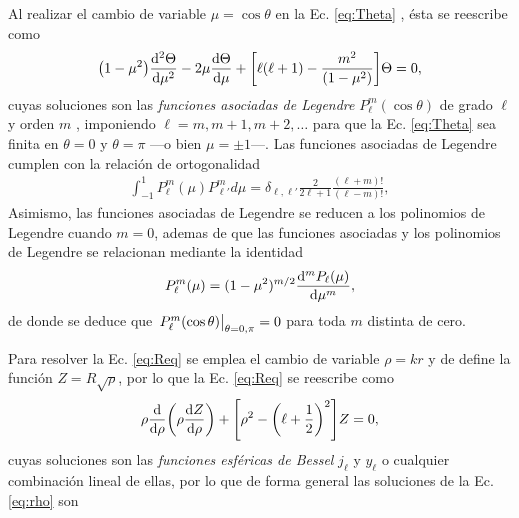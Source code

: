 Al realizar el cambio de variable $\mu = \cos\theta$ en la Ec. \eqref{eq:Theta} , ésta se reescribe como
	\begin{align*}
	\qty(1-\mu^2) \dv[2]{\Theta}{\mu} - 2 \mu \dv{\Theta}{\mu} + \qty[\ell(\ell+1)-\frac{m^2}{(1-\mu^2)}]\Theta= 0,
	\end{align*}
cuyas soluciones son	las \emph{funciones asociadas de Legendre} $P_\ell^m(\cos\theta)$ de grado $\ell$ y orden $m$  \cite{arfken2001methods}, imponiendo $\ell = m, m+1,m+2,\ldots$ para  que la Ec. \eqref{eq:Theta} sea finita en $\theta = 0$ y $\theta = \pi$ ---o bien $\mu=\pm1$---. Las funciones asociadas de Legendre cumplen con la relación de ortogonalidad
	\begin{align}
	\int_{-1}^1P_\ell^m(\mu) P_{\ell'}^md\mu = \delta_{\ell,\ell'}\frac{2}{2\ell+1}\frac{(\ell+m)!}{(\ell-m)!},
	\label{eq:ortLegendre}
	\end{align}
Asimismo, las funciones asociadas de Legendre se reducen a los polinomios de Legendre cuando $m=0$, ademas de que las funciones asociadas y los polinomios de Legendre se relacionan mediante la identidad  \cite{arfken2001methods}
	\begin{align}
	P_\ell^m (\mu) = (1-\mu^2)^{m/2}\dv[m]{P_\ell(\mu)}{\mu},
	\label{eq:Legendre}
	\end{align}
de donde se deduce  que $\eval{P_\ell^m(\cos\theta)}_{\theta=0,\pi}=0$ para toda $m$ distinta de cero. %

Para resolver la Ec. \eqref{eq:Req} se emplea el cambio de variable $\rho = k r$ y de define la función $Z =R\sqrt{\rho}$, por lo que la Ec. \eqref{eq:Req} se reescribe como
	\begin{align}
	\rho \dv{\rho}\qty(\rho\dv{Z}{\rho})+\qty[\rho^2-\qty(\ell+\frac12)^2] Z = 0,
	\label{eq:rho}
	\end{align}
cuyas soluciones son las \emph{funciones esféricas de Bessel} $j_\ell$ y $y_\ell$ o cualquier combinación lineal de ellas, por lo que de forma general las soluciones de la Ec. \eqref{eq:rho} son \cite{arfken2001methods}

